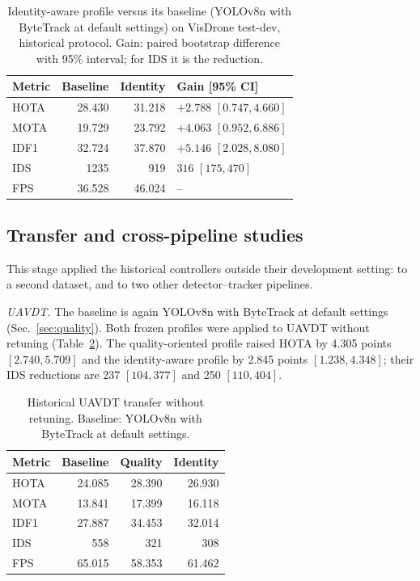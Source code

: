 \documentclass[journal]{new-aiaa}
\begin{document}
\begin{table}[htbp]
\caption{Identity-aware profile versus its baseline (YOLOv8n with ByteTrack at
default settings) on VisDrone test-dev, historical protocol. Gain: paired
bootstrap difference with 95\% interval; for IDS it is the reduction.}
\label{tab:identity}
\centering\footnotesize
\setlength{\tabcolsep}{4pt}
\begin{tabular}{@{}lrrl@{}}
\toprule
Metric & Baseline & Identity & Gain [95\% CI]\\
\midrule
HOTA & 28.430 & 31.218 & $+2.788$ $[0.747, 4.660]$\\
MOTA & 19.729 & 23.792 & $+4.063$ $[0.952, 6.886]$\\
IDF1 & 32.724 & 37.870 & $+5.146$ $[2.028, 8.080]$\\
IDS & 1235 & 919 & $316$ $[175, 470]$\\
FPS & 36.528 & 46.024 & --\\
\bottomrule
\end{tabular}
\end{table}

\subsection{Transfer and cross-pipeline studies}\label{sec:transfer}

This stage applied the historical controllers outside their development
setting: to a second dataset, and to two other detector--tracker pipelines.

\emph{UAVDT.} The baseline is again YOLOv8n with ByteTrack at default settings
(Sec.~\ref{sec:quality}). Both frozen profiles were applied to UAVDT
\cite{du2018uavdt} without retuning (Table~\ref{tab:hist-uavdt}). The
quality-oriented profile raised HOTA by 4.305 points $[2.740, 5.709]$ and the
identity-aware profile by 2.845 points $[1.238, 4.348]$; their IDS reductions
are 237 $[104, 377]$ and 250 $[110, 404]$.

\begin{table}[htbp]
\caption{Historical UAVDT transfer without retuning. Baseline: YOLOv8n with
ByteTrack at default settings.}
\label{tab:hist-uavdt}
\centering\footnotesize
\setlength{\tabcolsep}{4pt}
\begin{tabular}{@{}lrrr@{}}
\toprule
Metric & Baseline & Quality & Identity\\
\midrule
HOTA & 24.085 & 28.390 & 26.930\\
MOTA & 13.841 & 17.399 & 16.118\\
IDF1 & 27.887 & 34.453 & 32.014\\
IDS & 558 & 321 & 308\\
FPS & 65.015 & 58.353 & 61.462\\
\bottomrule
\end{tabular}
\end{table}
\end{document}
